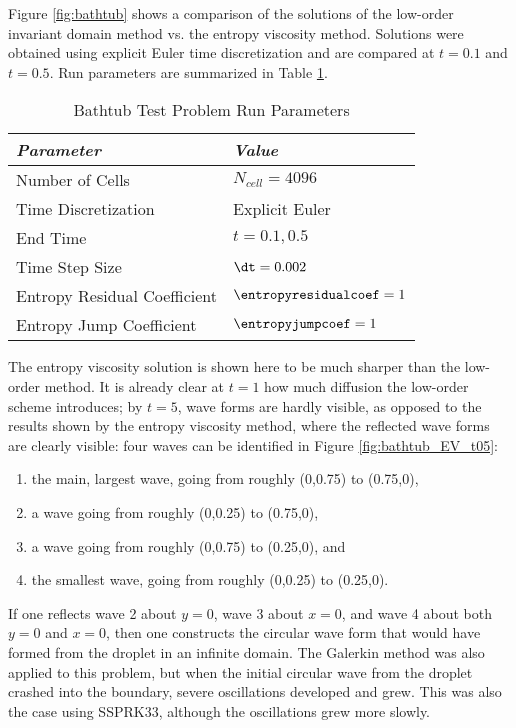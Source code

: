 Figure \ref{fig:bathtub} shows a comparison of the solutions of the low-order
invariant domain method vs. the entropy viscosity method. Solutions were obtained
using explicit Euler time discretization and are compared at $t = 0.1$ and
$t = 0.5$.
Run parameters are summarized in Table \ref{tab:bathtub_run_parameters}.

\begin{table}[ht]\caption{Bathtub Test Problem Run Parameters}
\label{tab:bathtub_run_parameters}
\centering
\begin{tabular}{l l}\toprule
\emph{Parameter} & \emph{Value}\\\midrule
Number of Cells & $N_{cell} = 4096$\\
Time Discretization & Explicit Euler\\
End Time & $t = 0.1, 0.5$\\
Time Step Size & $\dt = 0.002$\\\midrule
Entropy Residual Coefficient & $\entropyresidualcoef = 1$\\
Entropy Jump Coefficient & $\entropyjumpcoef = 1$\\
\bottomrule\end{tabular}
\end{table}

The entropy viscosity solution is shown here to be much sharper than
the low-order method. It is already
clear at $t = 1$ how much diffusion the low-order scheme introduces; by
$t = 5$, wave forms are hardly visible, as opposed to the results shown
by the entropy viscosity method, where the reflected wave forms are
clearly visible: four waves can be identified in Figure \ref{fig:bathtub_EV_t05}:
\begin{enumerate}
  \item the main, largest wave, going from roughly (0,0.75) to (0.75,0),
  \item a wave going from roughly (0,0.25) to (0.75,0),
  \item a wave going from roughly (0,0.75) to (0.25,0), and
  \item the smallest wave, going from roughly (0,0.25) to (0.25,0).
\end{enumerate}
If one reflects wave 2 about $y=0$, wave 3 about $x=0$, and wave 4 about
both $y=0$ and $x=0$, then one constructs the circular wave form
that would have formed from the droplet in an infinite domain.
The Galerkin method was also applied to this problem, but
when the initial circular wave from the droplet crashed into the boundary,
severe oscillations developed and grew. This was also the case using
SSPRK33, although the oscillations grew more slowly.

